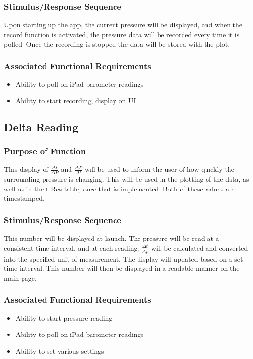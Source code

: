 \documentclass[onecolumn, draftclsnofoot,10pt, compsoc]{IEEEtran}
\begin{document}
\subsubsection{Stimulus/Response Sequence}
Upon starting up the app, the current pressure will be displayed, and when the record function is activated, the pressure data will be recorded every time it is polled.
Once the recording is stopped the data will be stored with the plot.
\subsubsection{Associated Functional Requirements}
\begin{itemize}
\item Ability to poll on-iPad barometer readings
\item Ability to start recording, display on UI
\end{itemize}

\subsection{Delta Reading}
\subsubsection{Purpose of Function}
This display of $\frac{\Delta t}{\Delta P}$ and $\frac{\Delta P}{\Delta t}$ will be used to inform the user of how quickly the surrounding pressure is changing.
This will be used in the plotting of the data, as well as in the t-Res table, once that is implemented.
Both of these values are timestamped.
\subsubsection{Stimulus/Response Sequence}
This number will be displayed at launch.
The pressure will be read at a consistent time interval, and at each reading, $\frac{\Delta t}{\Delta p}$ will be calculated and converted into the specified unit of measurement.
The display will updated based on a set time interval.
This number will then be displayed in a readable manner on the main page.
\subsubsection{Associated Functional Requirements}
\begin{itemize}
\item Ability to start pressure reading
\item Ability to poll on-iPad barometer readings
\item Ability to set various settings
\end{itemize}
\end{document}
